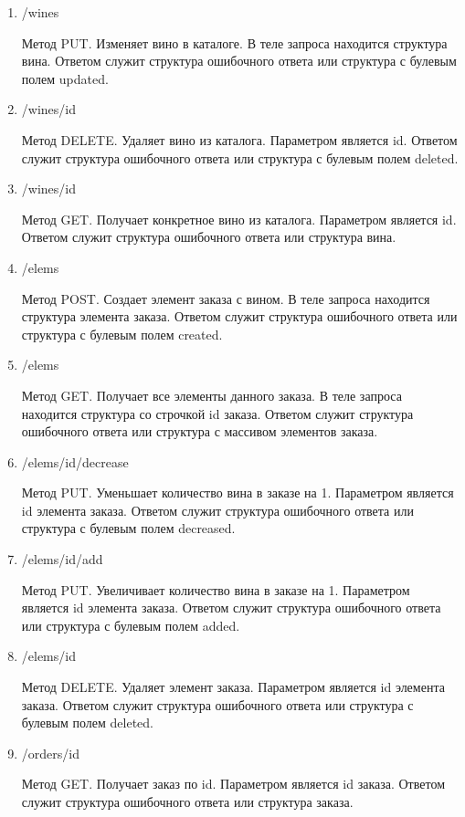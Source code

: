 \begin{enumerate}[label=\arabic*)]
\item /wines

Метод PUT. Изменяет вино в каталоге. В теле запроса находится структура вина.
Ответом служит структура ошибочного ответа или структура с булевым полем updated.

\item /wines/{id}

Метод DELETE. Удаляет вино из каталога. Параметром является id. Ответом служит структура ошибочного ответа или структура с булевым полем deleted.


\item /wines/{id}

Метод GET. Получает конкретное вино из каталога. Параметром является id. Ответом служит структура ошибочного ответа или структура вина.


\item /elems

Метод POST. Создает элемент заказа с вином. В теле запроса находится структура элемента заказа. Ответом служит структура ошибочного ответа или структура с булевым полем created.

\item /elems

Метод GET. Получает все элементы данного заказа. В теле запроса находится структура со строчкой id заказа. Ответом служит структура ошибочного ответа или структура с массивом элементов заказа.

\item /elems/{id}/decrease

Метод PUT. Уменьшает количество вина в заказе на 1. Параметром является id элемента заказа. Ответом служит структура ошибочного ответа или структура с булевым полем decreased.

\item /elems/{id}/add

Метод PUT. Увеличивает количество вина в заказе на 1. Параметром является id элемента заказа. Ответом служит структура ошибочного ответа или структура с булевым полем added.

\item /elems/{id}

Метод DELETE. Удаляет элемент заказа. Параметром является id элемента заказа. Ответом служит структура ошибочного ответа или структура с булевым полем deleted.

\item /orders/{id}

Метод GET. Получает заказ по id. Параметром является id заказа. Ответом служит структура ошибочного ответа или структура заказа.


\end{enumerate}
